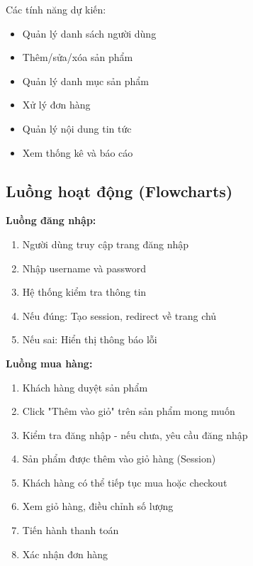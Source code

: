 Các tính năng dự kiến:
\begin{itemize}
    \item Quản lý danh sách người dùng
    \item Thêm/sửa/xóa sản phẩm
    \item Quản lý danh mục sản phẩm
    \item Xử lý đơn hàng
    \item Quản lý nội dung tin tức
    \item Xem thống kê và báo cáo
\end{itemize}

\subsection{Luồng hoạt động (Flowcharts)}

\textbf{Luồng đăng nhập:}
\begin{enumerate}
    \item Người dùng truy cập trang đăng nhập
    \item Nhập username và password
    \item Hệ thống kiểm tra thông tin
    \item Nếu đúng: Tạo session, redirect về trang chủ
    \item Nếu sai: Hiển thị thông báo lỗi
\end{enumerate}

\textbf{Luồng mua hàng:}
\begin{enumerate}
    \item Khách hàng duyệt sản phẩm
    \item Click "Thêm vào giỏ" trên sản phẩm mong muốn
    \item Kiểm tra đăng nhập - nếu chưa, yêu cầu đăng nhập
    \item Sản phẩm được thêm vào giỏ hàng (Session)
    \item Khách hàng có thể tiếp tục mua hoặc checkout
    \item Xem giỏ hàng, điều chỉnh số lượng
    \item Tiến hành thanh toán
    \item Xác nhận đơn hàng
\end{enumerate}
